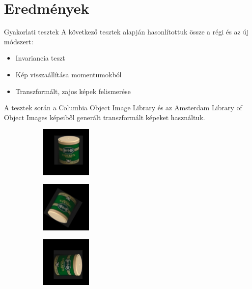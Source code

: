 \documentclass{beamer}
\begin{document}
\section{Eredmények}
\begin{frame}{Gyakorlati tesztek}
    \vskip 13mm
    A következő tesztek alapján hasonlítottuk össze a régi és az új módszert:
    \begin{itemize}
    \item Invariancia teszt
    \item Kép visszaállítása momentumokból
    \item Transzformált, zajos képek felismerése
    \end{itemize}
    A tesztek során a Columbia Object Image Library és az Amsterdam Library of Object Images képeiből generált transzformált képeket használtuk.
    \begin{figure}[tbp]
        \begin{subfigure}{0.3\textwidth}
            \centering
        \includegraphics[width=70pt]{figures/coil_rst/26x-11y9r0s1_0.png}
        \end{subfigure}
        \begin{subfigure}{0.3\textwidth}
            \centering
        \includegraphics[width=70pt]{figures/coil_rst/26x-11y9r150s0_5.png}
        \end{subfigure}
        \begin{subfigure}{0.3\textwidth}
            \centering
        \includegraphics[width=70pt]{figures/coil_rst/26x-11y9r270s1_75.png}
        \end{subfigure}
    \end{figure}
\end{frame}
\end{document}
